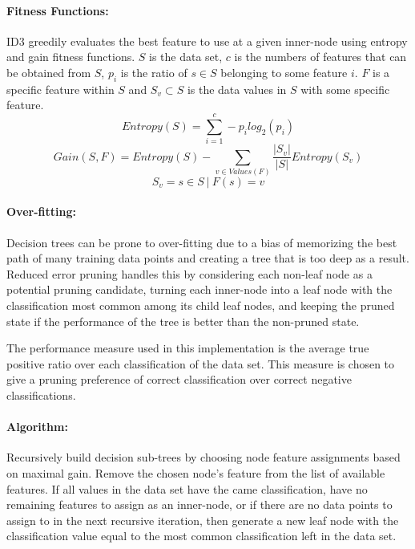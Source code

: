 \paragraph{Fitness Functions:}
ID3 greedily evaluates the best feature to use at a given inner-node using entropy and gain fitness functions. 
$S$ is the data set, $c$ is the numbers of features that can be obtained from $S$, $p_i$ is the ratio of $s \in S$ belonging to some feature $i$.
$F$ is a specific feature within $S$ and $S_v \subset S$ is the data values in $S$ with some specific feature. 
\begin{equation}\label{eq:entropy}
	Entropy(S) = \sum_{i=1}^{c}-p_i log_2 (p_i) 
\end{equation}
\begin{equation}\label{eq:gain}
	Gain(S,F) = Entropy(S) - \sum_{v \in Values(F)}\frac{|S_v|}{|S|}Entropy(S_v)
\end{equation}
\begin{equation}\label{eq:attribute-subset}
	S_v = {s \in S \> | \> F(s) = v}
\end{equation}

\paragraph{Over-fitting:}
Decision trees can be prone to over-fitting due to a bias of memorizing the best path of many training data points and creating a tree that is too deep as a result. 
Reduced error pruning handles this by considering each non-leaf node as a potential pruning candidate, turning each inner-node into a leaf node with the classification most common among its child leaf nodes, and keeping the pruned state if the performance of the tree is better than the non-pruned state.

The performance measure used in this implementation is the average true positive ratio over each classification of the data set.
This measure is chosen to give a pruning preference of correct classification over correct negative classifications.

\paragraph{Algorithm:}
Recursively build decision sub-trees by choosing node feature assignments based on maximal gain.
Remove the chosen node's feature from the list of available features.
If all values in the data set have the came classification, have no remaining features to assign as an inner-node, or if there are no data points to assign to in the next recursive iteration, then generate a new leaf node with the classification value equal to the most common classification left in the data set.

